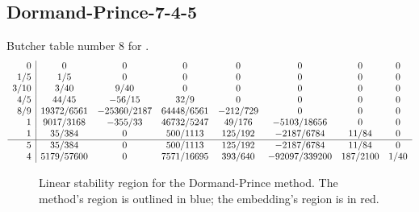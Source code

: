 \documentclass[letterpaper,10pt,english]{sphinxmanual}
\begin{document}
\subsection{Dormand-Prince-7-4-5}
\label{Butcher:dormand-prince-7-4-5}\label{Butcher:butcher-dormand-prince}
Butcher table number 8
for {\hyperref[c_interface/User_callable:ARKodeSetERKTableNum]{}}.
\begin{gather}
\begin{split}\begin{array}{r|ccccccc}
  0 & 0 & 0 & 0 & 0 & 0 & 0 & 0 \\
  1/5 & 1/5 & 0 & 0 & 0 & 0 & 0 & 0 \\
  3/10 & 3/40 & 9/40 & 0 & 0 & 0 & 0 & 0 \\
  4/5 & 44/45 & -56/15 & 32/9 & 0 & 0 & 0 & 0 \\
  8/9 & 19372/6561 & -25360/2187 & 64448/6561 & -212/729 & 0 & 0 & 0 \\
  1 & 9017/3168 & -355/33 & 46732/5247 & 49/176 & -5103/18656 & 0 & 0 \\
  1 & 35/384 & 0 & 500/1113 & 125/192 & -2187/6784 & 11/84 & 0 \\
  \hline
  5 & 35/384 & 0 & 500/1113 & 125/192 & -2187/6784 & 11/84 & 0 \\
  4 & 5179/57600 & 0 & 7571/16695 & 393/640 & -92097/339200 & 187/2100 & 1/40
\end{array}\end{split}\notag
\end{gather}\begin{figure}[htbp]
\centering
\capstart

\caption{Linear stability region for the Dormand-Prince method.  The method's
region is outlined in blue; the embedding's region is in red.}\end{figure}
\end{document}
